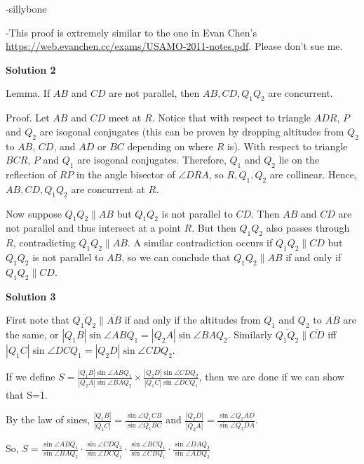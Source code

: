 \begin{enumerate}
 -sillybone

 -This proof is extremely similar to the one in Evan Chen's \href{https://web.evanchen.cc/exams/USAMO-2011-notes.pdf}{https://web.evanchen.cc/exams/USAMO-2011-notes.pdf}. Please don't sue me.

 



\textbf{Solution 2}

Lemma. If $AB$ and $CD$ are not parallel, then $AB, CD, Q_1 Q_2$ are concurrent.

 Proof. Let $AB$ and $CD$ meet at $R$. Notice that with respect to triangle $ADR$, $P$ and $Q_2$ are isogonal conjugates (this can be proven by dropping altitudes from $Q_2$ to $AB$, $CD$, and $AD$ or $BC$ depending on where $R$ is). With respect to triangle $BCR$, $P$ and $Q_1$ are isogonal conjugates. Therefore, $Q_1$ and $Q_2$ lie on the reflection of $RP$ in the angle bisector of $\angle{DRA}$, so $R, Q_1, Q_2$ are collinear. Hence, $AB, CD, Q_1 Q_2$ are concurrent at $R$.

 Now suppose $Q_1 Q_2 \parallel AB$ but $Q_1 Q_2$ is not parallel to $CD$. Then $AB$ and $CD$ are not parallel and thus intersect at a point $R$. But then $Q_1 Q_2$ also passes through $R$, contradicting $Q_1 Q_2 \parallel AB$. A similar contradiction occurs if $Q_1 Q_2 \parallel CD$ but $Q_1 Q_2$ is not parallel to $AB$, so we can conclude that $Q_1 Q_2 \parallel AB$ if and only if $Q_1 Q_2 \parallel CD$.

 



\textbf{Solution 3}

First note that $\overline{Q_1 Q_2} \parallel \overline{AB}$ if and only if the altitudes from $Q_1$ and $Q_2$ to $\overline{AB}$ are the same, or $|Q_1B|\sin \angle ABQ_1 =|Q_2A|\sin \angle BAQ_2$.  Similarly $\overline{Q_1 Q_2} \parallel \overline{CD}$ iff $|Q_1C|\sin \angle DCQ_1 =|Q_2D|\sin \angle CDQ_2$.

 
If we define $S =\frac{|Q_1B|\sin \angle ABQ_1}{|Q_2A|\sin \angle BAQ_2} \times \frac{|Q_2D|\sin \angle CDQ_2}{|Q_1C|\sin \angle DCQ_1}$, then we are done if we can show that S=1.

 
By the law of sines, $\frac{|Q_1B|}{|Q_1C|}=\frac{\sin\angle Q_1CB}{\sin\angle Q_1BC}$ and $\frac{|Q_2D|}{|Q_2A|}=\frac{\sin\angle Q_2AD}{\sin\angle Q_2DA}$.

 
So, $S=\frac{\sin \angle ABQ_1}{\sin \angle BAQ_2}\cdot\frac{\sin \angle CDQ_2}{\sin \angle DCQ_1}\cdot\frac{\sin \angle BCQ_1}{\sin \angle CBQ_1}\cdot\frac{\sin \angle DAQ_2}{\sin \angle ADQ_2}$


\end{enumerate}
